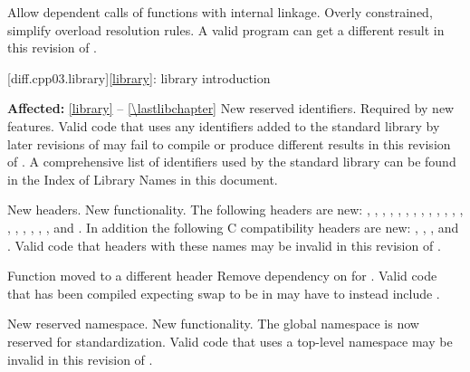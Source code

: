\change
Allow dependent calls of functions with internal linkage.
\rationale
Overly constrained, simplify overload resolution rules.
\effect
A valid \CppIII{} program can get a different result in this
revision of \Cpp{}.

[diff.cpp03.library]{\ref{library}: library introduction}

\pnum
\textbf{Affected:} \ref{library} -- \ref{\lastlibchapter}
\change
New reserved identifiers.
\rationale
Required by new features.
\effect
Valid \CppIII{} code that uses any identifiers added to the \Cpp{} standard
library by later revisions of \Cpp{} may fail to compile or produce different
results in this revision of \Cpp{}. A comprehensive list of identifiers used
by the \Cpp{} standard library can be found in the Index of Library Names in this
document.

\change
New headers.
\rationale
New functionality.
\effect
The following \Cpp{} headers are new:
,
,
,
,
,
,
,
,
,
,
,
,
,
,
,
,
,
,
,
and
.
In addition the following C compatibility headers are new:
,
,
,
and
.
Valid \CppIII{} code that  headers with these names may be
invalid in this revision of \Cpp{}.

\effect
Function  moved to a different header
\rationale
Remove dependency on  for .
\effect
Valid \CppIII{} code that has been compiled expecting swap to be in
 may have to instead include .

\change
New reserved namespace.
\rationale
New functionality.
\effect
The global namespace  is now reserved for standardization. Valid
\CppIII{} code that uses a top-level namespace  may be invalid in
this revision of \Cpp{}.

